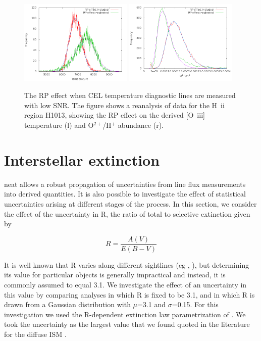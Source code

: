 \documentclass[useAMS,usenatbib]{mn2e}
\begin{document}
\begin{figure}
\includegraphics[width=0.48\textwidth]{figures/h1013_rp_temperature.png}
\includegraphics[width=0.48\textwidth]{figures/h1013_rp_abundance.png}
\caption{The RP effect when CEL temperature diagnostic lines are measured with low SNR.  The figure shows a reanalysis of data for the H~{\sc ii} region H1013, showing the RP effect on the derived [O~{\sc iii}] temperature (l) and O$^{2+}$/H$^+$ abundance (r).}
\label{h1013_RP_effect}
\end{figure}

\section{Interstellar extinction}
\label{extinction}

{\sc neat} allows a robust propagation of uncertainties from line flux measurements into derived quantities.  It is also possible to investigate the effect of statistical uncertainties arising at different stages of the process.  In this section, we consider the effect of the uncertainty in R, the ratio of total to selective extinction given by

\begin{equation}
R = \frac{A(V)}{E(B-V)}
\end{equation}

It is well known that R varies along different sightlines (eg \citet{2004ApJ...616..912V}, \citet{2005ApJ...623..897L}), but determining its value for particular objects is generally impractical and instead, it is commonly assumed to equal 3.1.  We investigate the effect of an uncertainty in this value by comparing analyses in which R is fixed to be 3.1, and in which R is drawn from a Gaussian distribution with $\mu$=3.1 and $\sigma$=0.15.  For this investigation we used the R-dependent extinction law parametrization of \citet{1989ApJ...345..245C}.  We took the uncertainty as the largest value that we found quoted in the literature for the diffuse ISM \citep{2005ApJ...623..897L}.
\end{document}
